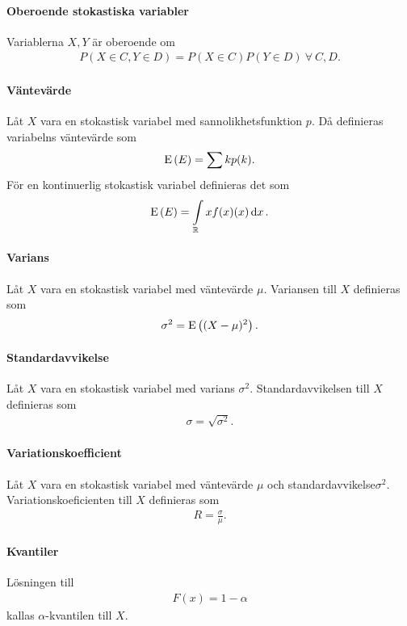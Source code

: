 \paragraph{Oberoende stokastiska variabler}
Variablerna $X, Y$ är oberoende om
\begin{align*}
	P(X\in C, Y\in D) = P(X\in C)P(Y\in D)\ \forall\ C, D.
\end{align*}

\paragraph{Väntevärde}
Låt $X$ vara en stokastisk variabel med sannolikhetsfunktion $p$. Då definieras variabelns väntevärde som
\begin{align*}
	\text{E}\left(E\right) = \sum kp(k).
\end{align*}
För en kontinuerlig stokastisk variabel definieras det som
\begin{align*}
	\text{E}\left(E\right) = \int\limits_{\mathbb{R}}{}xf(x)(x)\dd{x}.
\end{align*}

\paragraph{Varians}
Låt $X$ vara en stokastisk variabel med väntevärde $\mu$. Variansen till $X$ definieras som
\begin{align*}
	\sigma^2 = \text{E}\left((X - \mu)^2\right).
\end{align*}

\paragraph{Standardavvikelse}
Låt $X$ vara en stokastisk variabel med varians $\sigma^2$. Standardavvikelsen till $X$ definieras som
\begin{align*}
	\sigma = \sqrt{\sigma^2}.
\end{align*}

\paragraph{Variationskoefficient}
Låt $X$ vara en stokastisk variabel med väntevärde $\mu$ och standardavvikelse$\sigma^2$. Variationskoeficienten till $X$ definieras som
\begin{align*}
	R = \frac{\sigma}{\mu}.
\end{align*}

\paragraph{Kvantiler}
Lösningen till
\begin{align*}
	F(x) = 1 - \alpha
\end{align*}
kallas $\alpha$-kvantilen till $X$.

